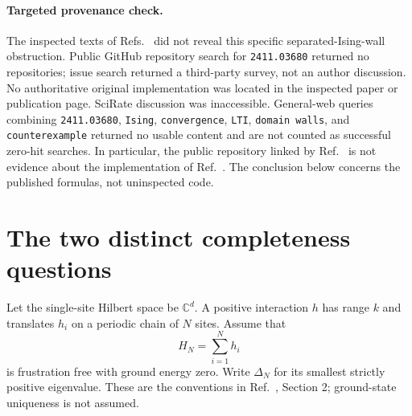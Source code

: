 \documentclass{article}
\begin{document}
\paragraph{Targeted provenance check.}
The inspected texts of Refs.~\cite{LTI,RMS,Rao,Xu} did not reveal this
specific separated-Ising-wall obstruction. Public GitHub repository
search for \texttt{2411.03680} returned no repositories; issue search
returned a third-party survey, not an author discussion. No authoritative
original implementation was located in the inspected paper or publication
page. SciRate discussion was inaccessible. General-web queries combining
\texttt{2411.03680}, \texttt{Ising}, \texttt{convergence},
\texttt{LTI}, \texttt{domain walls}, and \texttt{counterexample}
returned no usable content and are not counted as successful zero-hit
searches. In particular, the public repository linked by Ref.~\cite{Xu}
is not evidence about the implementation of Ref.~\cite{LTI}.
The conclusion below concerns the published formulas, not uninspected code.

\section{The two distinct completeness questions}
\label{sec:questions}

Let the single-site Hilbert space be $\mathbb C^d$. A positive interaction
$h$ has range $k$ and translates $h_i$ on a periodic chain of $N$ sites.
Assume that
\begin{equation}
  H_N=\sum_{i=1}^N h_i
\end{equation}
is frustration free with ground energy zero. Write $\Delta_N$ for its
smallest strictly positive eigenvalue. These are the conventions in
Ref.~\cite{LTI}, Section 2; ground-state uniqueness is not assumed.
\end{document}
